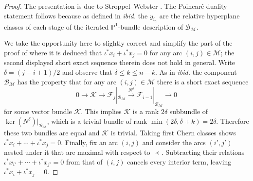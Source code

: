 \documentclass[11pt]{amsart}
\theoremstyle{definition}
\numberwithin{equation}{section}
\begin{document}
\begin{proof}
    The presentation is due to Stroppel--Webster \cite[Theorem 9]{SW12}. The Poincar\'e duality statement follows because as defined in \textit{ibid.} the $y_{i_a}$ are the relative hyperplane classes of each stage of the iterated $\mathbb{P}^1$-bundle description of $\mathcal{B}_\mathcal{M}$.

    We take the opportunity here to slightly correct and simplify the part of the proof of \cite[Theorem 9]{SW12} where it is deduced that $\iota^*x_{i}+\iota^*x_{j}=0$ for any arc $(i,j)\in \mathcal{M}$; the second displayed short exact sequence therein does not hold in general.
    Write $\delta=(j-i+1)/2$ and observe that $\delta\leq k\leq n-k$.
    As in \textit{ibid.} the component $\mathcal{B}_\mathcal{M}$ has the property that for any arc $(i,j)\in \mathcal{M}$ there is a short exact sequence $$0\to \mathcal{K}\to \mathcal{F}_j|_{\mathcal{B}_\mathcal{M}}\xrightarrow{N^{\delta}} \mathcal{F}_{i-1}|_{\mathcal{B}_\mathcal{M}}\to 0$$
    for some vector bundle $\mathcal{K}$.
    This implies $\mathcal{K}$ is a rank $2\delta$ subbundle of $\ker(N^{\delta})|_{\mathcal{B}_\mathcal{M}}$, which is a trivial bundle of rank $\min(2\delta,\delta+k)=2\delta$.
    Therefore these two bundles are equal and $\mathcal{K}$ is trivial.
    Taking first Chern classes shows  $\iota^*x_i+\cdots+\iota^*x_j=0$.
    Finally, fix an arc $(i,j)$ and consider the arcs $(i',j')$ nested under it that are maximal with respect to $\prec$.
    Subtracting their relations $\iota^*x_{i'}+\cdots+\iota^*x_{j'}=0$ from that of $(i,j)$ cancels every interior term, leaving $\iota^*x_i+\iota^*x_j=0$.
\end{proof}
\end{document}
